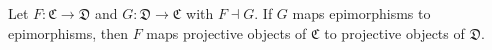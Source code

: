 Let $F: \mathfrak{C} \to \mathfrak{D}$ and $G: \mathfrak{D} \to \mathfrak{C}$ with $F \dashv G$. If $G$ maps epimorphisms to epimorphisms, then $F$ maps projective objects of $\mathfrak{C}$ to projective objects of $\mathfrak{D}$.
